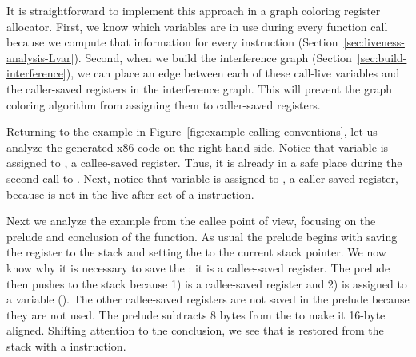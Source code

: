 \documentclass[7x10,nocrop]{TimesAPriori_MIT}%
\begin{document}
It is straightforward to implement this approach in a graph coloring
register allocator. First, we know which variables are in use during
every function call because we compute that information for every
instruction (Section~\ref{sec:liveness-analysis-Lvar}). Second, when
we build the interference graph
(Section~\ref{sec:build-interference}), we can place an edge between
each of these call-live variables and the caller-saved registers in
the interference graph. This will prevent the graph coloring algorithm
from assigning them to caller-saved registers.

Returning to the example in
Figure~\ref{fig:example-calling-conventions}, let us analyze the
generated x86 code on the right-hand side. Notice that variable
 is assigned to , a callee-saved register. Thus, it
is already in a safe place during the second call to
. Next, notice that variable  is assigned to
, a caller-saved register, because  is not in the
live-after set of a  instruction.

Next we analyze the example from the callee point of view, focusing on
the prelude and conclusion of the  function. As usual the
prelude begins with saving the  register to the stack and
setting the  to the current stack pointer. We now know why
it is necessary to save the : it is a callee-saved register.
The prelude then pushes  to the stack because 1) 
is a callee-saved register and 2)  is assigned to a variable
(). The other callee-saved registers are not saved in the
prelude because they are not used. The prelude subtracts 8 bytes from
the  to make it 16-byte aligned. Shifting attention to the
conclusion, we see that  is restored from the stack with a
 instruction.
\end{document}
